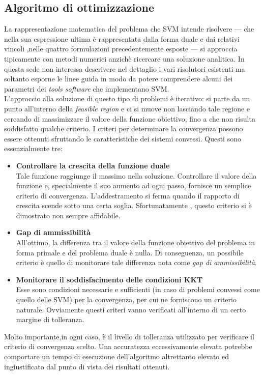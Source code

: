  \subsection{Algoritmo di ottimizzazione}
 La rappresentazione matematica del problema che \ac{SVM} intende risolvere --- che nella sua espressione ultima è rappresentata dalla forma duale e dai relativi vincoli ,nelle quattro formulazioni precedentemente esposte  --- si approccia tipicamente con metodi numerici anzichè ricercare una soluzione analitica. In questa sede non interessa descrivere nel dettaglio i vari risolutori esistenti ma soltanto esporne le linee guida in modo da potere comprendere alcuni dei parametri dei \textit{tools software} che implementano \ac{SVM}. \\
 L'approccio alla soluzione di questo tipo di problemi è iterativo: si parte da un punto all'interno della \textit{feasible region} e ci si muove non lasciando tale regione e cercando di massimizzare il valore della funzione obiettivo, fino a che non risulta soddisfatto qualche criterio. I criteri per determinare la convergenza  possono essere ottenuti sfruttando le caratteristiche dei sistemi convessi. Questi sono essenzialmente tre:
 \begin{itemize}
 \item \textbf{Controllare la crescita della funzione duale}\\Tale funzione raggiunge il massimo nella soluzione. Controllare il valore della funzione e, specialmente il suo aumento ad ogni passo, fornisce un semplice criterio di convergenza. L'addestramento si ferma quando il rapporto di crescita scende sotto una certa soglia. Sfortunatamente , questo criterio si è dimostrato non sempre affidabile.
 \item \textbf{Gap di ammissibilità}\\All'ottimo, la differenza tra il valore della funzione obiettivo del problema in forma primale e del problema duale è nulla. Di conseguenza, un possibile criterio è quello di monitorare tale differenza nota come \textit{gap di ammissibilità}.
 \item \textbf{Monitorare il soddisfacimento delle condizioni KKT}\\Esse sono condizioni necessarie e sufficienti (in caso di problemi convessi come quello delle \ac{SVM}) per la convergenza, per cui ne forniscono un criterio naturale.
 Ovviamente questi criteri vanno verificati all'interno di un certo margine di tolleranza.
 \end{itemize}
 Molto importante,in ogni caso, è il livello di tolleranza utilizzato per verificare il criterio di convergenza scelto. Una accuratezza eccessivamente elevata potrebbe comportare un tempo di esecuzione dell'algoritmo altrettanto elevato ed ingiustificato dal punto di vista dei risultati ottenuti.
 
